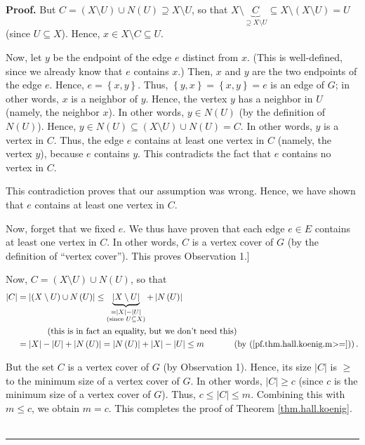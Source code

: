 \documentclass[numbers=enddot,12pt,final,onecolumn,notitlepage]{scrartcl}%
\theoremstyle{definition}
\newenvironment{proof}[1][Proof]{\noindent\textbf{#1.} }{\ \rule{0.5em}{0.5em}}
\begin{document}
\begin{proof}
But $C=\left(  X\setminus U\right)  \cup N\left(  U\right)  \supseteq
X\setminus U$, so that $X\setminus\underbrace{C}_{\supseteq X\setminus
U}\subseteq X\setminus\left(  X\setminus U\right)  =U$ (since $U\subseteq X$).
Hence, $x\in X\setminus C\subseteq U$.

Now, let $y$ be the endpoint of the edge $e$ distinct from $x$. (This is
well-defined, since we already know that $e$ contains $x$.) Then, $x$ and $y$
are the two endpoints of the edge $e$. Hence, $e=\left\{  x,y\right\}  $.
Thus, $\left\{  y,x\right\}  =\left\{  x,y\right\}  =e$ is an edge of $G$; in
other words, $x$ is a neighbor of $y$. Hence, the vertex $y$ has a neighbor in
$U$ (namely, the neighbor $x$). In other words, $y\in N\left(  U\right)  $ (by
the definition of $N\left(  U\right)  $). Hence, $y\in N\left(  U\right)
\subseteq\left(  X\setminus U\right)  \cup N\left(  U\right)  =C$. In other
words, $y$ is a vertex in $C$. Thus, the edge $e$ contains at least one vertex
in $C$ (namely, the vertex $y$), because $e$ contains $y$. This contradicts
the fact that $e$ contains no vertex in $C$.

This contradiction proves that our assumption was wrong. Hence, we have shown
that $e$ contains at least one vertex in $C$.

Now, forget that we fixed $e$. We thus have proven that each edge $e\in E$
contains at least one vertex in $C$. In other words, $C$ is a vertex cover of
$G$ (by the definition of \textquotedblleft vertex cover\textquotedblright).
This proves Observation 1.]

Now, $C=\left(  X\setminus U\right)  \cup N\left(  U\right)  $, so that
\begin{align*}
\left\vert C\right\vert  &  =\left\vert \left(  X\setminus U\right)  \cup
N\left(  U\right)  \right\vert \leq\underbrace{\left\vert X\setminus
U\right\vert }_{\substack{=\left\vert X\right\vert -\left\vert U\right\vert
\\\text{(since }U\subseteq X\text{)}}}+\left\vert N\left(  U\right)
\right\vert \\
&  \ \ \ \ \ \ \ \ \ \ \left(  \text{this is in fact an equality, but we don't
need this}\right)  \\
&  =\left\vert X\right\vert -\left\vert U\right\vert +\left\vert N\left(
U\right)  \right\vert =\left\vert N\left(  U\right)  \right\vert +\left\vert
X\right\vert -\left\vert U\right\vert \leq m\ \ \ \ \ \ \ \ \ \ \left(
\text{by (\ref{pf.thm.hall.koenig.m>=})}\right)  .
\end{align*}


But the set $C$ is a vertex cover of $G$ (by Observation 1). Hence, its size
$\left\vert C\right\vert $ is $\geq$ to the minimum size of a vertex cover of
$G$. In other words, $\left\vert C\right\vert \geq c$ (since $c$ is the
minimum size of a vertex cover of $G$). Thus, $c\leq\left\vert C\right\vert
\leq m$. Combining this with $m\leq c$, we obtain $m=c$. This completes the
proof of Theorem \ref{thm.hall.koenig}.
\end{proof}
\end{document}

